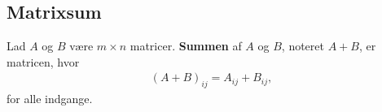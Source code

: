 \subsection{Matrixsum}
%
\begin{defn}{}{}
Lad $A$ og $B$ være $m \times n$ matricer.
\textbf{Summen} af $A$ og $B$, noteret $A + B$, er matricen, hvor \begin{align*}
(A + B)_{ij} = A_{ij} + B_{ij},
\end{align*}
for alle indgange.
\end{defn}
%
